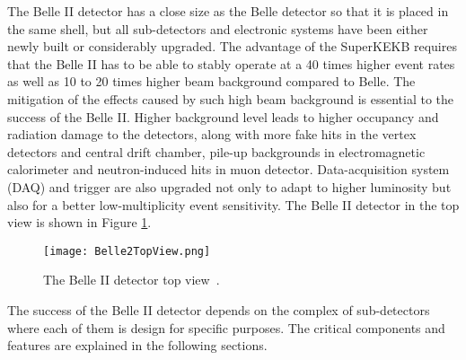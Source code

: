 The Belle II detector has a close size as the Belle detector so that it is placed in the same shell, but all sub-detectors and electronic systems have been either newly built or considerably upgraded. The advantage of the SuperKEKB requires that the Belle II has to be able to stably operate at a 40 times higher event rates as well as 10 to 20 times higher beam background compared to Belle. The mitigation of the effects caused by such high beam background is essential to the success of the Belle II. Higher background level leads to higher occupancy and radiation damage to the detectors, along with more fake hits in the vertex detectors and central drift chamber, pile-up backgrounds in electromagnetic calorimeter and neutron-induced hits in muon detector. Data-acquisition system (DAQ) and trigger are also upgraded not only to adapt to higher luminosity but also for a better low-multiplicity event sensitivity. The Belle II detector in the top view is shown in Figure \ref{fig:belle2_view}.

\begin{comment}
 and expected performances are summarized as follows: 


\textbullet \space vertex resolution of $B$ mesons of $\sim 50 \: \mu\text{m}$,

\textbullet \space excellent reconstruction efficiency for charged tracks down to several 100 MeV and fairly good efficiency for charged tracks down to $\sim$ 50 MeV,

\textbullet \space excellent momentum resolution up to 8 GeV/c,

\textbullet \space highly efficient particle identification to separate $\pi^{\pm}$, $\mu^{\pm}$, $e^{\pm}$, $K^{\pm}$ and $p$ at full energy range of experiment,

\textbullet \space full cover of experimental acceptance solid angle,

\textbullet \space ultra fast and highly efficiency DAQ and trigger system to cope with large data quantities and fast triggering frequency. 
\end{comment}

\begin{figure}[htbp]
	\centering 
	\texttt{[image: Belle2TopView.png]}
	\caption{The Belle II detector top view~\cite{b2book}.}
	\label{fig:belle2_view}
\end{figure}

The success of the Belle II detector depends on the complex of sub-detectors where each of them is design for specific purposes. The critical components and features are explained in the following sections. 

